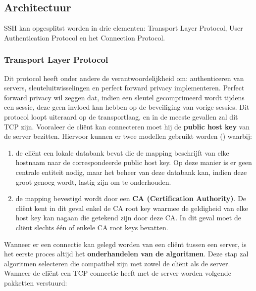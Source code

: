 \documentclass{report}
\begin{document}
	\subsection{Architectuur}
	SSH kan opgesplitst worden in drie elementen: Transport Layer Protocol, User Authentication Protocol en het Connection Protocol.
	\subsubsection{Transport Layer Protocol}
	Dit protocol heeft onder andere de verantwoordelijkheid om: authenticeren van servers, sleuteluitwisselingen en perfect forward privacy implementeren. Perfect forward privacy wil zeggen dat, indien een sleutel gecomprimeerd wordt tijdens een sessie, deze geen invloed kan hebben op de beveiliging van vorige sessies. Dit protocol loopt uiteraard op de transportlaag, en in de meeste gevallen zal dit TCP zijn. Vooraleer de cliënt kan connecteren moet hij de \textbf{public host key} van de server bezitten. Hiervoor kunnen er twee modellen gebruikt worden () waarbij: 
	\begin{enumerate}
		\item de cliënt een lokale databank bevat die de mapping beschrijft van elke hostnaam naar de correspondeerde public host key. Op deze manier is er geen centrale entiteit nodig, maar het beheer van deze databank kan, indien deze groot genoeg wordt, lastig zijn om te onderhouden.
		\item de mapping bevestigd wordt door een \textbf{CA (Certification Authority)}. De cliënt kent in dit geval enkel de CA root key waarmee de geldigheid van elke host key kan nagaan die getekend zijn door deze CA. In dit geval moet de cliënt slechts één of enkele CA root keys bevatten. 
	\end{enumerate}
	Wanneer er een connectie kan gelegd worden van een cliënt tussen een server, is het eerste proces altijd het \textbf{onderhandelen van de algoritmen}. Deze stap zal algoritmen selecteren die compatibel zijn met zowel de cliënt als de server. Wanneer de cliënt een TCP connectie heeft met de server worden volgende pakketten verstuurd:
\end{document}

